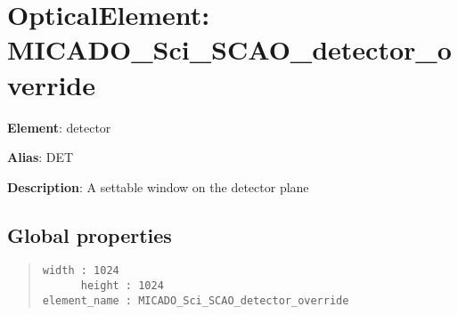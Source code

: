 

\section{OpticalElement: \textquotedbl{}MICADO\_Sci\_SCAO\_detector\_override\textquotedbl{}%
  \label{opticalelement-micado-sci-scao-detector-override}%
}

\textbf{Element}: detector

\textbf{Alias}: DET

\textbf{Description}: A settable window on the detector plane


\subsection{Global properties%
  \label{global-properties}%
}

\begin{quote}
\begin{alltt}
\begin{lstlisting}[frame=single]
       width : 1024
      height : 1024
element_name : MICADO_Sci_SCAO_detector_override
\end{lstlisting}
\end{alltt}
\end{quote}
